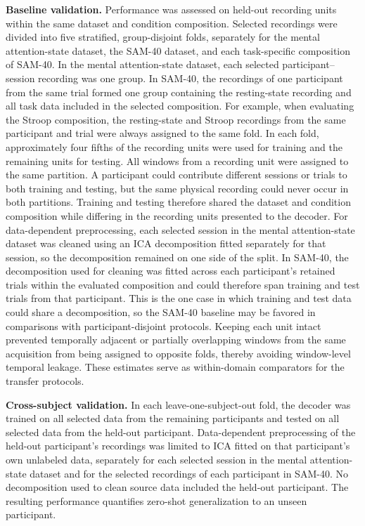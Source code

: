 \documentclass[10pt,letterpaper]{article}
\newcommand{\rev}[1]{#1}
\begin{document}
\textbf{Baseline validation.}
\rev{Performance was assessed on held-out recording units within the same dataset and condition composition. Selected recordings were divided into five stratified, group-disjoint folds, separately for the mental attention-state dataset, the SAM-40 dataset, and each task-specific composition of SAM-40. In the mental attention-state dataset, each selected participant--session recording was one group. In SAM-40, the recordings of one participant from the same trial formed one group containing the resting-state recording and all task data included in the selected composition. For example, when evaluating the Stroop composition, the resting-state and Stroop recordings from the same participant and trial were always assigned to the same fold. In each fold, approximately four fifths of the recording units were used for training and the remaining units for testing. All windows from a recording unit were assigned to the same partition. A participant could contribute different sessions or trials to both training and testing, but the same physical recording could never occur in both partitions. Training and testing therefore shared the dataset and condition composition while differing in the recording units presented to the decoder. For data-dependent preprocessing, each selected session in the mental attention-state dataset was cleaned using an ICA decomposition fitted separately for that session, so the decomposition remained on one side of the split. In SAM-40, the decomposition used for cleaning was fitted across each participant's retained trials within the evaluated composition and could therefore span training and test trials from that participant. This is the one case in which training and test data could share a decomposition, so the SAM-40 baseline may be favored in comparisons with participant-disjoint protocols. Keeping each unit intact prevented temporally adjacent or partially overlapping windows from the same acquisition from being assigned to opposite folds, thereby avoiding window-level temporal leakage. These estimates serve as within-domain comparators for the transfer protocols.}

\textbf{Cross-subject validation.}
\rev{In each leave-one-subject-out fold, the decoder was trained on all selected data from the remaining participants and tested on all selected data from the held-out participant. Data-dependent preprocessing of the held-out participant's recordings was limited to ICA fitted on that participant's own unlabeled data, separately for each selected session in the mental attention-state dataset and for the selected recordings of each participant in SAM-40. No decomposition used to clean source data included the held-out participant. The resulting performance quantifies zero-shot generalization to an unseen participant.}
\end{document}
